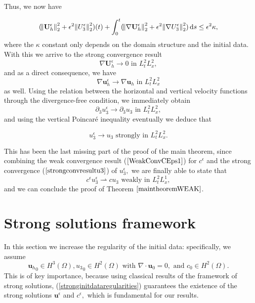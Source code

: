 \documentclass[12pt]{report}
\numberwithin{theorem}{chapter}
\numberwithin{corollary}{chapter}
\numberwithin{lemma}{chapter}
\numberwithin{remark}{chapter}
\numberwithin{definition}{chapter}
\numberwithin{prop}{chapter}
\newcommand*\diff{\mathop{}\!\mathrm{d}}
\begin{document}
Thus, we now have

$$ (\norm{\mathbf{U}_h^\epsilon}_2^2 + \epsilon^2 \norm{U_3^\epsilon}_2^2)(t) + \int_0^t (\norm{\nabla \mathbf{U}_h^\epsilon}_2^2 + \epsilon^2 \norm{\nabla U_3^\epsilon}_2^2) \diff s \leq \epsilon^2 \kappa,$$
%
where the $\kappa$ constant only depends on the domain structure and the initial data. With this we arrive to the strong convergence result $$\nabla \mathbf{U}_h^\epsilon \to 0 \text{ in } L^2_t L^2_x,$$ and as a direct consequence, we have $$\nabla \mathbf{u}_h^\epsilon \to \nabla \mathbf{u}_h \text{ in } L^2_t L^2_x$$ as well. Using the relation between the horizontal and vertical velocity functions through the divergence-free condition, we immediately obtain $$\partial_3 u_3^\epsilon \to \partial_3 u_3 \text{ in } L^2_t L^2_x,$$ and using the vertical Poincar\'e inequality eventually we deduce that

\begin{equation}\label{strongconvresultu3}u_3^\epsilon \to u_3 \text{ strongly in } L^2_t L^2_x.\end{equation}

This has been the last missing part of the proof of the main theorem, since combining the weak convergence result ($\ref{WeakConvCEps1}$) for $c^\epsilon$ and the strong convergence ($\ref{strongconvresultu3}$) of $u_3^\epsilon,$ we are finally able to state that
%
\begin{equation}c^\epsilon u_3^\epsilon \rightharpoonup c u_3 \text{ weakly in } L_t^2 L_x^1,\end{equation}
%
and we can conclude the proof of Theorem $\ref{maintheoremWEAK}$.

\section{Strong solutions framework} \label{sectionSTRONGsol}

In this section we increase the regularity of the initial data: specifically, we assume \begin{equation}\label{stronginitdataregularities}{\mathbf{u}_h}_0 \in H^3(\Omega), {u_3}_0 \in H^2(\Omega) \text{ with } \nabla \cdot \mathbf{u}_0 = 0, \text{ and } c_0 \in H^2 (\Omega).\end{equation} This is of key importance, because using classical results of the framework of strong solutions, (\ref{stronginitdataregularities}) guarantees the existence of the strong solutions $\mathbf{u}^\epsilon$ and $c^\epsilon,$ which is fundamental for our results.
\end{document}
